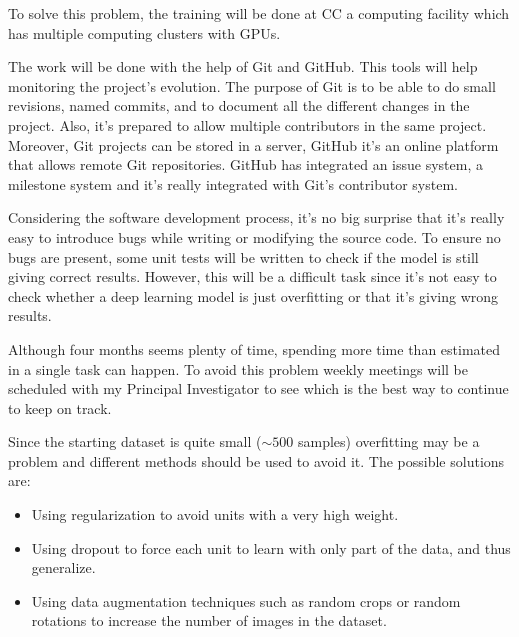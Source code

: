 To solve this problem, the training will be done at \gls{CC} a computing facility which 
has multiple computing clusters with GPUs.


The work will be done with the help of Git and GitHub. This tools will help monitoring
the project's evolution. The purpose of Git is to be able to do small revisions,
named commits, and to document all the different changes in the project. Also, it's 
prepared to allow multiple contributors in the same project. Moreover,
Git projects can be stored in a server, GitHub it's an online platform that allows
remote Git repositories. GitHub has integrated an issue system, a milestone system
and it's really integrated with Git's contributor system.
~\cites{tool:git}{tool:github}


Considering the software development process, it's no big surprise that it's really easy to
introduce bugs while writing or modifying the source code. To ensure no bugs are present,
some unit tests will be written to check if the model is still giving correct results.
However, this will be a difficult task since it's not easy to check whether a deep 
learning model is just overfitting or that it's giving wrong results.


Although four months seems plenty of time, spending more time than estimated in a single task
can happen. To avoid this problem weekly meetings will be scheduled with my Principal Investigator
to see which is the best way to continue to keep on track.


Since the starting dataset is quite small (\( \sim 500 \) samples) overfitting may be a problem
and different methods should be used to avoid it. The possible solutions are:
\begin{itemize}
  \item Using regularization to avoid units with a very high weight.
  \item Using dropout to force each unit to learn with only part of the data, and thus generalize.
  \item Using data augmentation techniques such as random crops or random rotations to increase
  the number of images in the dataset.
\end{itemize}
